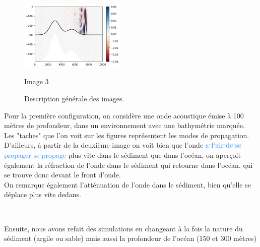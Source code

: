 \documentclass{rapportECC}
\newcommand{\FAadd}[1]{\textcolor{DodgerBlue}{{#1}}}                     %
\newcommand{\FAdel}[1]{\textcolor{DodgerBlue}{\sout{#1}}}                %
\begin{document}
\begin{figure}[H]
    \begin{minipage}{0.9\textwidth}
        \centering
        \includegraphics[width=0.45\textwidth]{images/im6.png}
        \caption{Image 3}
        \label{fig:image3}
    \end{minipage}
    \caption{Description générale des images.}
    \label{fig:three_images}
\end{figure}
Pour la première configuration, on considère une onde acoustique émise à 100 mètres de profondeur, dans un environnement avec une bathymétrie marquée. \\
Les "taches" que l'on voit sur les figures représentent les modes de propagation. \\
D'ailleurs, à  partir de la deuxième image on voit bien que l'onde \FAdel{a l'air de se propager}  \FAadd{se propage} plus vite dans le sédiment que dans l'océan, on aperçoit également la réfraction de l'onde dans le sédiment qui retourne dans l'océan, qui se trouve donc devant le front d'onde.\\
On remarque également l'atténuation de l'onde dans le sédiment, bien qu'elle se déplace plus vite dedans.

\\
\vspace{1 cm}

Ensuite, nous avons refait des simulations en changeant à la fois la nature du sédiment (argile ou sable) mais aussi la profondeur de l'océan (150 et 300 mètres)
\end{document}
